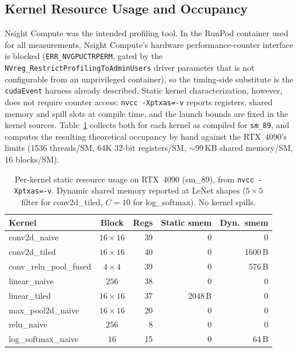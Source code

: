 \documentclass[conference]{IEEEtran}
\begin{document}
\subsection{Kernel Resource Usage and Occupancy}
\label{sec:kernel-resource}
Nsight Compute was the intended profiling tool. In the
RunPod container used for all measurements, Nsight Compute's hardware
performance-counter interface is blocked (\texttt{ERR\_NVGPUCTRPERM},
gated by the \texttt{NVreg\_RestrictProfilingToAdminUsers} driver
parameter that is not configurable from an unprivileged container),
so the timing-side substitute is the \texttt{cudaEvent} harness
already described. Static kernel characterization, however, does not
require counter access: \texttt{nvcc -Xptxas=-v} reports registers,
shared memory and spill slots at compile time, and the launch bounds
are fixed in the kernel sources. Table~\ref{tab:kernel-resource}
collects both for each kernel as compiled for \texttt{sm\_89}, and
computes the resulting theoretical occupancy by hand against the
RTX~4090's limits (1536 threads/SM, 64K 32-bit registers/SM,
$\sim$99\,KB shared memory/SM, 16 blocks/SM).

\begin{table}[tb]
\caption{Per-kernel static resource usage on RTX~4090 (sm\_89),
from \texttt{nvcc -Xptxas=-v}. Dynamic shared memory reported at
LeNet shapes ($5{\times}5$ filter for conv2d\_tiled, $C{=}10$ for
log\_softmax). No kernel spills.}
\label{tab:kernel-resource}
\begin{center}
\footnotesize
\setlength{\tabcolsep}{3pt}
\begin{tabular}{@{}l c r r r@{}}
\toprule
Kernel & Block & Regs & Static smem & Dyn.\ smem \\
\midrule
conv2d\_naive            & $16{\times}16$ & 39 & 0        & 0        \\
conv2d\_tiled            & $16{\times}16$ & 40 & 0        & 1600\,B  \\
conv\_relu\_pool\_fused  & $4{\times}4$   & 39 & 0        & 576\,B   \\
linear\_naive            & $256$          & 38 & 0        & 0        \\
linear\_tiled            & $16{\times}16$ & 37 & 2048\,B  & 0        \\
max\_pool2d\_naive       & $16{\times}16$ & 20 & 0        & 0        \\
relu\_naive              & $256$          & 8  & 0        & 0        \\
log\_softmax\_naive      & $16$           & 15 & 0        & 64\,B    \\
\bottomrule
\end{tabular}
\end{center}
\end{table}
\end{document}
